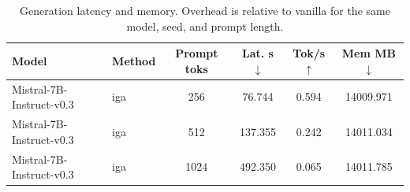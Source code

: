 \begin{table}[t]
\centering
\caption{Generation latency and memory. Overhead is relative to vanilla for the same model, seed, and prompt length.}
\label{tab:efficiency}
\small
\begin{tabular}{llcccc}
\toprule
Model & Method & Prompt toks & Lat. s$\downarrow$ & Tok/s$\uparrow$ & Mem MB$\downarrow$ \\
\midrule
Mistral-7B-Instruct-v0.3 & iga & 256 & 76.744 & 0.594 & 14009.971 \\
Mistral-7B-Instruct-v0.3 & iga & 512 & 137.355 & 0.242 & 14011.034 \\
Mistral-7B-Instruct-v0.3 & iga & 1024 & 492.350 & 0.065 & 14011.785 \\
\bottomrule
\end{tabular}
\end{table}
